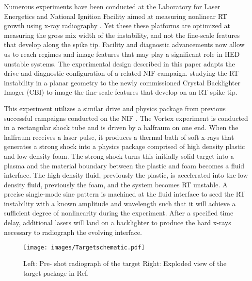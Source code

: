
 Numerous experiments have been conducted at the Laboratory for Laser Energetics and National Ignition Facility aimed at measuring nonlinear RT growth using x-ray radiography \cite{Nagel:2017, Robey:2003, Zhou:2017}. Yet these these platforms are optimized at measuring the gross mix width of the instability, and not the fine-scale features that develop along the spike tip.  Facility and diagnostic advancements now allow us to reach regimes and image features that may play a significant role in HED unstable systems. The experimental design described in this paper adapts the drive and diagnostic configuration of a related NIF campaign.\cite{Nagel:2017, doss2015shock} studying the RT instability in a planar geometry to the newly commissioned Crystal Backlighter Imager (CBI) to image the fine-scale features that develop on an RT spike tip. 
 
 
 This experiment utilizes a similar drive and physics package from previous successful campaigns conducted on the NIF \cite{Nagel:2017, Robey:2003}. The Vortex experiment is conducted in a rectangular shock tube and is driven by a halfraum on one end.  When the halfraum receives a laser pulse, it produces a thermal bath of soft x-rays that generates a strong shock into a physics package comprised of high density plastic and low density foam. The strong shock turns this initially solid target into a plasma and the material boundary between the plastic and foam becomes a fluid interface. The high density fluid, previously the plastic, is accelerated into the low density fluid, previously the foam, and the system becomes RT unstable.  A precise single-mode sine pattern is machined at the fluid interface to seed the RT instability with a known amplitude and wavelength such that it will achieve a sufficient degree of nonlinearity during the experiment.   After a specified time delay, additional lasers will land on a backlighter to produce the hard x-rays necessary to radiograph the evolving interface.  \\


  \begin{figure}[h]
 \begin{center}
 \texttt{[image: images/Targetschematic.pdf]}
 \caption{Left: Pre- shot radiograph of the target Right: Exploded view of the target package in Ref. \cite{Nagel:2017} }
 \label{fig:TargetLayout}
 \end{center}
 \end{figure}
 

